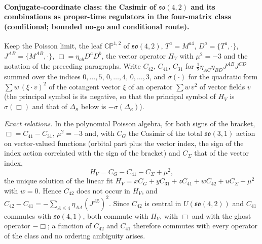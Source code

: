 \paragraph{Conjugate-coordinate class: the Casimir of \(\mathfrak{so}(4,2)\) and its combinations as proper-time regulators in the four-matrix class (conditional; bounded no-go and conditional route).}
Keep the Poisson limit, the leaf \(\mathbb{CP}^{1,2}\) of \(\mathfrak{so}(4,2)\), \(T^a=M^{a4}\), \(D^a=\{T^a,\cdot\}\), \(J^{AB}=\{M^{AB},\cdot\}\), \(\Box=\eta_{ab}D^aD^b\), the vector operator \(H_V\) with \(\mu^2=-3\) and the notation of the preceding paragraphs. Write \(C_{42}\), \(C_{41}\), \(C_{31}\) for \(\tfrac12\eta_{AC}\eta_{BD}J^{AB}J^{CD}\) summed over the indices \(0,\dots,5\), \(0,\dots,4\), \(0,\dots,3\), and \(\sigma(\cdot)\) for the quadratic form \(\sum w\,(\xi\!\cdot\!v)^2\) of the cotangent vector \(\xi\) of an operator \(\sum w\,v^2\) of vector fields \(v\) (the principal symbol is its negative, so that the principal symbol of \(H_V\) is \(\sigma(\Box)\) and that of \(\Delta_\kappa\) below is \(-\sigma(\Delta_\kappa)\)).

\emph{Exact relations.} In the polynomial Poisson algebra, for both signs of the bracket, \(\Box=C_{41}-C_{31}\), \(\mu^2=-3\) and, with \(C_G\) the Casimir of the total \(\mathfrak{so}(3,1)\) action on vector-valued functions (orbital part plus the vector index, the sign of the index action correlated with the sign of the bracket) and \(C_\Sigma\) that of the vector index,
\[
H_V=C_G-C_{41}-C_\Sigma+\mu^2 ,
\]
the unique solution of the linear fit \(H_V=xC_G+yC_{31}+zC_{41}+wC_{42}+uC_\Sigma+\mu^2\) with \(w=0\). Hence \(C_{42}\) does not occur in \(H_V\), and \(C_{42}-C_{41}=-\sum_{A\le4}\eta_{AA}(J^{A5})^2\). Since \(C_{42}\) is central in \(U(\mathfrak{so}(4,2))\) and \(C_{41}\) commutes with \(\mathfrak{so}(4,1)\), both commute with \(H_V\), with \(\Box\) and with the ghost operator \(-\Box\); a function of \(C_{42}\) and \(C_{41}\) therefore commutes with every operator of the class and no ordering ambiguity arises.

